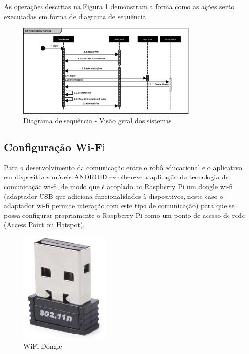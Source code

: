 As operações descritas na Figura \ref{fig:sequencia} demonstram a forma como as ações serão executadas em forma de diagrama de sequência

\begin{figure}[H]
    \centering
    \includegraphics[width=0.8\textwidth]{figuras/diagrama_de_sequencia.eps}
    \caption{Diagrama de sequência - Visão geral dos sistemas}
    \label{fig:sequencia}
\end{figure}

\subsection{Configuração Wi-Fi}

Para o desenvolvimento da comunicação entre o robô educacional e o aplicativo em dispositivos móveis ANDROID escolheu-se a aplicação da
tecnologia de comunicação wi-fi, de modo que é acoplado ao Raspberry Pi um dongle wi-fi (adaptador USB que adiciona funcionalidades à
dispositivos, neste caso o adaptador wi-fi permite interação com este tipo de comunicação) para que se possa configurar propriamente o
Raspberry Pi como um ponto de acesso de rede (Access Point ou Hotspot).

\begin{figure}[H]
    \centering
    \includegraphics[width=0.4\textwidth]{figuras/adaptador_wifi.eps}
    \caption{ WiFi Dongle}
    \label{fig:catia01}
\end{figure}


